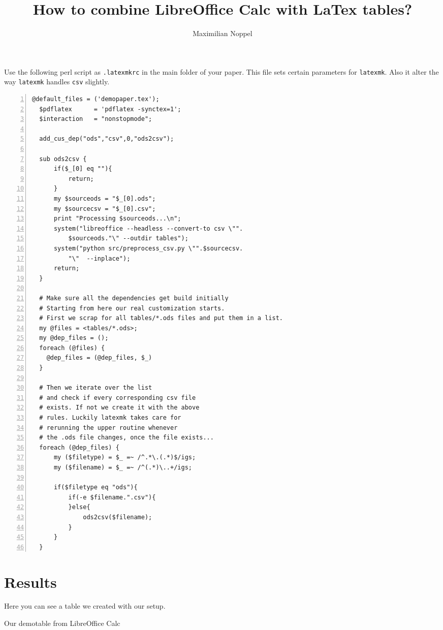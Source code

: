 \documentclass{scrartcl}
\title{How to combine LibreOffice Calc with LaTex tables?}
\author{Maximilian Noppel}
\begin{document}
\maketitle


Use the following perl script as \texttt{.latexmkrc} in the main folder of your paper. 
This file sets certain parameters for \texttt{latexmk}.
Also it alter the way \texttt{latexmk} handles \texttt{csv} slightly.

\begin{lstlisting}[numbers=left]
  @default_files = ('demopaper.tex');
  $pdflatex      = 'pdflatex -synctex=1';
  $interaction   = "nonstopmode";
  
  add_cus_dep("ods","csv",0,"ods2csv");
  
  sub ods2csv {
      if($_[0] eq ""){
          return;
      }
      my $sourceods = "$_[0].ods";
      my $sourcecsv = "$_[0].csv";
      print "Processing $sourceods...\n";
      system("libreoffice --headless --convert-to csv \"". 
          $sourceods."\" --outdir tables");
      system("python src/preprocess_csv.py \"".$sourcecsv. 
          "\"  --inplace");
      return;
  }
  
  # Make sure all the dependencies get build initially
  # Starting from here our real customization starts.
  # First we scrap for all tables/*.ods files and put them in a list.
  my @files = <tables/*.ods>;
  my @dep_files = ();
  foreach (@files) {
    @dep_files = (@dep_files, $_)
  }
  
  # Then we iterate over the list
  # and check if every corresponding csv file
  # exists. If not we create it with the above
  # rules. Luckily latexmk takes care for 
  # rerunning the upper routine whenever
  # the .ods file changes, once the file exists...
  foreach (@dep_files) {
      my ($filetype) = $_ =~ /^.*\.(.*)$/igs;
      my ($filename) = $_ =~ /^(.*)\..+/igs;
  
      if($filetype eq "ods"){
          if(-e $filename.".csv"){
          }else{
              ods2csv($filename);
          }
      }
  }
\end{lstlisting}

\section*{Results}
Here you can see a table we created with our setup.

\begin{table}[!h]
  \caption{
    Our demotable from LibreOffice Calc
  }
  \label{tab:demotable}
  \centering
  
\end{table}



\end{document}
